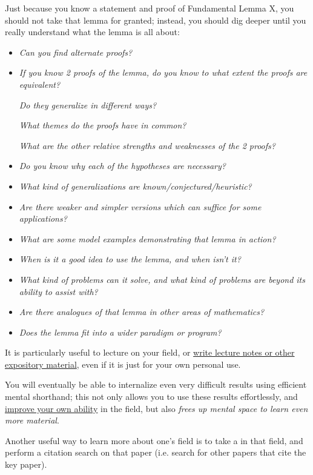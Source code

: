 \documentclass{article}
\begin{document}
%
Just because you know a statement and proof of Fundamental Lemma X, you should not take that lemma for granted; instead, you should dig deeper until you really understand what the lemma is all about:
\begin{itemize}
	\item \textit{Can you find alternate proofs?}
	\item \textit{If you know 2 proofs of the lemma, do you know to what extent the proofs are equivalent?}
	
	\textit{Do they generalize in different ways?}
	
	\textit{What themes do the proofs have in common?}
	
	\textit{What are the other relative strengths and weaknesses of the 2 proofs?}
	\item \textit{Do you know why each of the hypotheses are necessary?}
	\item \textit{What kind of generalizations are known/conjectured/heuristic?}
	\item \textit{Are there weaker and simpler versions which can suffice for some applications?}
	\item \textit{What are some model examples demonstrating that lemma in action?}
	\item \textit{When is it a good idea to use the lemma, and when isn't it?}
	\item \textit{What kind of problems can it solve, and what kind of problems are beyond its ability to assist with?}
	\item \textit{Are there analogues of that lemma in other areas of mathematics?}
	\item \textit{Does the lemma fit into a wider paradigm or program?}
\end{itemize}
It is particularly useful to lecture on your field, or \href{https://terrytao.wordpress.com/career-advice/write-down-what-youve-done/}{write lecture notes or other expository material}, even if it is just for your own personal use.

You will eventually be able to internalize even very difficult results using efficient mental shorthand; this not only allows you to use these results effortlessly, and \href{https://terrytao.wordpress.com/career-advice/continually-aim-just-beyond-your-current-range/}{improve your own ability} in the field, but also \textit{frees up mental space to learn even more material}.

%
Another useful way to learn more about one's field is to take a  in that field, and perform a citation search on that paper (i.e. search for other papers that cite the key paper).
\end{document}
